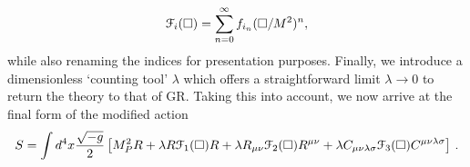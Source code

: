  \[
 \label{Fcurly}
 {\cal F}_i(\Box)=\sum^{\infty}_{n=0}f_{i_n}(\Box/M^2)^n
 ,\]
while also renaming the indices for presentation purposes. Finally, we introduce a dimensionless `counting tool' $\lambda$ which offers a straightforward limit $\lambda\rightarrow 0$ to return the theory to that of GR. Taking this into account, we now arrive at the final form of the modified action
\[ \label{action}
S=\int d^4x\frac{\sqrt{-g}}{2}\left[M_P^2R+ \lambda R{\cal F}_1(\Box)R
+\lambda R_{\mu\nu} {\cal F}_2(\Box)R^{\mu\nu}
+\lambda C_{\mu\nu\lambda\sigma} {\cal F}_{3}(\Box)C^{\mu\nu\lambda\sigma}\right]\,.
\]
